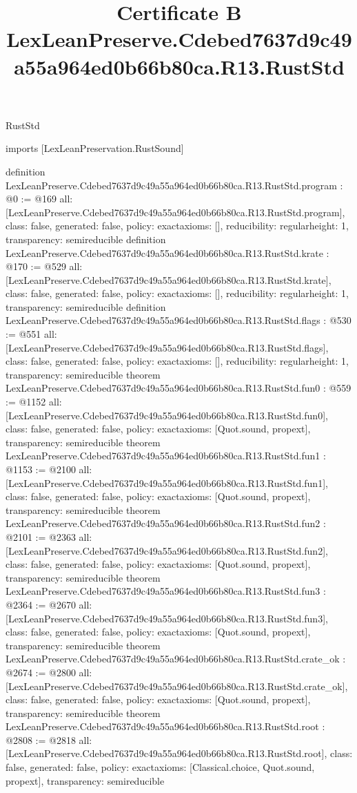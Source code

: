\begin{lexlean}{RustStd}
\title{Certificate B LexLeanPreserve.Cdebed7637d9c49a55a964ed0b66b80ca.R13.RustStd}
\begin{coremodule}
imports [LexLeanPreservation.RustSound]

definition LexLeanPreserve.Cdebed7637d9c49a55a964ed0b66b80ca.R13.RustStd.program : @0 := @169 {
  all: [LexLeanPreserve.Cdebed7637d9c49a55a964ed0b66b80ca.R13.RustStd.program],
  class: false,
  generated: false,
  policy: exact{axioms: []},
  reducibility: regular{height: 1},
  transparency: semireducible
}
definition LexLeanPreserve.Cdebed7637d9c49a55a964ed0b66b80ca.R13.RustStd.krate : @170 := @529 {
  all: [LexLeanPreserve.Cdebed7637d9c49a55a964ed0b66b80ca.R13.RustStd.krate],
  class: false,
  generated: false,
  policy: exact{axioms: []},
  reducibility: regular{height: 1},
  transparency: semireducible
}
definition LexLeanPreserve.Cdebed7637d9c49a55a964ed0b66b80ca.R13.RustStd.flags : @530 := @551 {
  all: [LexLeanPreserve.Cdebed7637d9c49a55a964ed0b66b80ca.R13.RustStd.flags],
  class: false,
  generated: false,
  policy: exact{axioms: []},
  reducibility: regular{height: 1},
  transparency: semireducible
}
theorem LexLeanPreserve.Cdebed7637d9c49a55a964ed0b66b80ca.R13.RustStd.fun0 : @559 := @1152 {
  all: [LexLeanPreserve.Cdebed7637d9c49a55a964ed0b66b80ca.R13.RustStd.fun0],
  class: false,
  generated: false,
  policy: exact{axioms: [Quot.sound, propext]},
  transparency: semireducible
}
theorem LexLeanPreserve.Cdebed7637d9c49a55a964ed0b66b80ca.R13.RustStd.fun1 : @1153 := @2100 {
  all: [LexLeanPreserve.Cdebed7637d9c49a55a964ed0b66b80ca.R13.RustStd.fun1],
  class: false,
  generated: false,
  policy: exact{axioms: [Quot.sound, propext]},
  transparency: semireducible
}
theorem LexLeanPreserve.Cdebed7637d9c49a55a964ed0b66b80ca.R13.RustStd.fun2 : @2101 := @2363 {
  all: [LexLeanPreserve.Cdebed7637d9c49a55a964ed0b66b80ca.R13.RustStd.fun2],
  class: false,
  generated: false,
  policy: exact{axioms: [Quot.sound, propext]},
  transparency: semireducible
}
theorem LexLeanPreserve.Cdebed7637d9c49a55a964ed0b66b80ca.R13.RustStd.fun3 : @2364 := @2670 {
  all: [LexLeanPreserve.Cdebed7637d9c49a55a964ed0b66b80ca.R13.RustStd.fun3],
  class: false,
  generated: false,
  policy: exact{axioms: [Quot.sound, propext]},
  transparency: semireducible
}
theorem LexLeanPreserve.Cdebed7637d9c49a55a964ed0b66b80ca.R13.RustStd.crate_ok : @2674 := @2800 {
  all: [LexLeanPreserve.Cdebed7637d9c49a55a964ed0b66b80ca.R13.RustStd.crate_ok],
  class: false,
  generated: false,
  policy: exact{axioms: [Quot.sound, propext]},
  transparency: semireducible
}
theorem LexLeanPreserve.Cdebed7637d9c49a55a964ed0b66b80ca.R13.RustStd.root : @2808 := @2818 {
  all: [LexLeanPreserve.Cdebed7637d9c49a55a964ed0b66b80ca.R13.RustStd.root],
  class: false,
  generated: false,
  policy: exact{axioms: [Classical.choice, Quot.sound, propext]},
  transparency: semireducible
}


\end{coremodule}
\end{lexlean}
